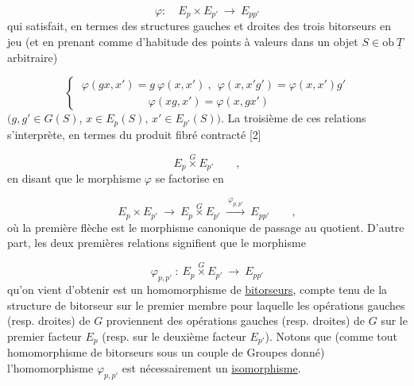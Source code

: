 \begin{equation*}
\varphi : \quad E_p \times E_{p'} \ \longrightarrow\ E_{pp'}
\end{equation*}
qui satisfait, en termes des structures gauches et droites des trois bitorseurs en jeu (et en prenant comme d'habitude des points à valeurs dans un objet $S \in \mathrm{ob}\ \underline{T}$ arbitraire)

\begin{equation}\tag{1.1.3.0}
\left\{\ \begin{array}{l} \varphi(gx,x') = g\ \varphi(x,x')\ ,\ \ \varphi(x,x'g') = \varphi(x,x')g' \\[3ex] \qquad\qquad\qquad \varphi(xg,x') = \varphi(x,gx') \end{array}\right.
\end{equation}
$(g,g' \in G(S)$, $x \in E_p(S)$, $x' \in E_{p'}(S))$. La troisième de ces relations s'interprète, en termes du produit fibré contracté [2]

\begin{equation*}
E_p \overset{G}{\times} E_{p'} \qquad ,
\end{equation*}
en disant que le morphisme $\varphi$ se factorise en

\begin{equation*}
E_p \times E_{p'} \ \longrightarrow\ E_p \overset{G}{\times} E_{p'} \ \xrightarrow{\ \varphi_{p,p'}\ }\ E_{pp'} \qquad ,
\end{equation*}
où la première flèche est le morphisme canonique de passage au quotient. D'autre part, les deux premières relations signifient que le morphisme

\begin{equation}\tag{1.1.3.1}
\varphi_{p,p'} \ :\ E_p \overset{G}{\times} E_{p'} \ \longrightarrow\ E_{pp'}
\end{equation}
qu'on vient d'obtenir est un homomorphisme de \underline{bitorseurs}, compte tenu de la structure de bitorseur sur le premier membre pour laquelle les opérations
gauches (resp. droites) de $G$ proviennent des opérations gauches (resp. droites) de $G$ sur le premier facteur $E_p$ (resp. sur le deuxième facteur $E_{p'}$). Notons que (comme tout homomorphisme de bitorseurs sous un couple de Groupes donné) l'homomorphisme $\varphi_{p,p'}$ est nécessairement un \underline{isomorphisme}.

